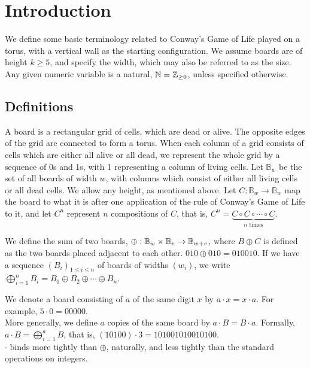 \documentclass[12pt,letterpaper]{article}
\begin{document}
\section{Introduction}
We define some basic terminology related to Conway's Game of Life played on a torus, with a vertical wall as the starting configuration. We assume boards are of height $k\geq 5$, and specify the width, which may also be referred to as the size. Any given numeric variable is a natural, $\mathbb{N}=\mathbb{Z}_{\geq 0}$, unless specified otherwise.
\subsection{Definitions}
\begin{dfn}
  A board is a rectangular grid of cells, which are dead or alive. The opposite edges of the grid are connected to form a torus. When each column of a grid consists of cells which are either all alive or all dead, we represent the whole grid by a sequence of 0s and 1s, with 1 representing a column of living cells. Let $\mathbb{B}_w$ be the set of all boards of width $w$, with columns which consist of either all living cells or all dead cells. We allow any height, as mentioned above. Let $C:\mathbb{B}_w\rightarrow \mathbb{B}_w$ map the board to what it is after one application of the rule of Conway's Game of Life to it, and let $C^n$ represent $n$ compositions of $C$, that is, $C^n=\underbrace{C\circ C\circ\cdots \circ C}_{n \text{ times}}$. 
\end{dfn}
\begin{dfn}
  We define the sum of two boards, $\oplus:\mathbb{B}_w\times \mathbb{B}_v\rightarrow \mathbb{B}_{w+v}$, where $B\oplus C$ is defined as the two boards placed adjacent to each other. $010\oplus 010 = 010010$. If we have a sequence ${(B_i)}_{1\leq i\leq n}$ of boards of widths $(w_i)$, we write $\displaystyle\bigoplus_{i=1}^{n}B_i = B_1\oplus B_2\oplus\cdots\oplus B_n$. 
\end{dfn}
\begin{dfn}
  We denote a board consisting of $a$ of the same digit $x$ by $a\cdot x = x\cdot a$. For example, $5\cdot 0=00000$. \\
  More generally, we define $a$ copies of the same board by $a\cdot B = B\cdot a$. Formally, $a\cdot B = \displaystyle\bigoplus_{i=1}^{a}B$, that is, $(10100)\cdot 3 = 101001010010100$. \\
  $\cdot$ binds more tightly than $\oplus$, naturally, and less tightly than the standard operations on integers. 
\end{dfn}
\end{document}
